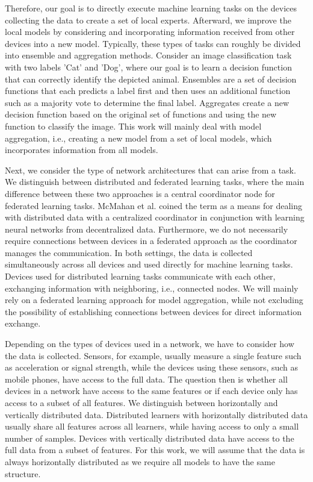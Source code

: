 Therefore, our goal is to directly execute machine learning tasks on the devices collecting the data to create a set of local experts.
Afterward, we improve the local models by considering and incorporating information received from other devices into a new model.
Typically, these types of tasks can roughly be divided into ensemble and aggregation methods. 
Consider an image classification task with two labels 'Cat' and 'Dog', where our goal is to learn a decision function that can correctly identify the depicted animal.
Ensembles are a set of decision functions that each predicts a label first and then uses an additional function such as a majority vote to determine the final label.
Aggregates create a new decision function based on the original set of functions and using the new function to classify the image.
This work will mainly deal with model aggregation, i.e., creating a new model from a set of local models, which incorporates information from all models.

Next, we consider the type of network architectures that can arise from a task. 
We distinguish between distributed and federated learning tasks, where the main difference between these two approaches is a central coordinator node for federated learning tasks.
McMahan et al. \cite{mcmahan2016communication} coined the term as a means for dealing with distributed data with a centralized coordinator in conjunction with learning neural networks from decentralized data.
Furthermore, we do not necessarily require connections between devices in a federated approach as the coordinator manages the communication.
In both settings, the data is collected simultaneously across all devices and used directly for machine learning tasks.
Devices used for distributed learning tasks communicate with each other, exchanging information with neighboring, i.e., connected nodes.
We will mainly rely on a federated learning approach for model aggregation, while not excluding the possibility of establishing connections between devices for direct information exchange.

Depending on the types of devices used in a network, we have to consider how the data is collected.
Sensors, for example, usually measure a single feature such as acceleration or signal strength, while the devices using these sensors, such as mobile phones, have access to the full data.
The question then is whether all devices in a network have access to the same features or if each device only has access to a subset of all features.
We distinguish between horizontally and vertically distributed data.
Distributed learners with horizontally distributed data usually share all features across all learners, while having access to only a small number of samples. 
Devices with vertically distributed data have access to the full data from a subset of features.
For this work, we will assume that the data is always horizontally distributed as we require all models to have the same structure.
%


